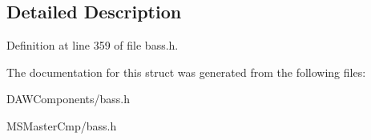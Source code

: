 \subsection{Detailed Description}


Definition at line 359 of file bass.\-h.



The documentation for this struct was generated from the following files\-:\begin{DoxyCompactItemize}
\item 
D\-A\-W\-Components/bass.\-h\item 
M\-S\-Master\-Cmp/bass.\-h\end{DoxyCompactItemize}
